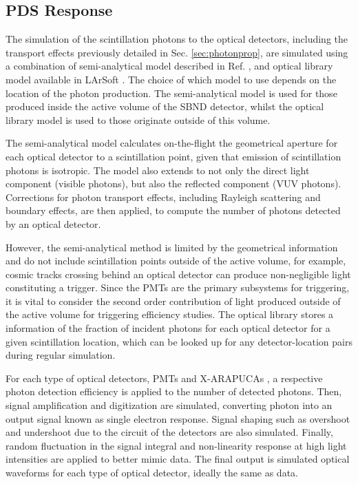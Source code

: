 \subsection{PDS Response}

The simulation of the scintillation photons to the optical detectors, including the transport effects previously detailed in Sec. \ref{sec:photonprop}, are simulated using a combination of semi-analytical model described in Ref. \cite{}, and optical library model available in LArSoft \cite{}.
The choice of which model to use depends on the location of the photon production.
The semi-analytical model is used for those produced inside the active volume of the SBND detector, whilst the optical library model is used to those originate outside of this volume.

The semi-analytical model calculates on-the-flight the geometrical aperture for each optical detector to a scintillation point, given that emission of scintillation photons is isotropic.
The model also extends to not only the direct light component (visible photons), but also the reflected component (VUV photons). 
Corrections for photon transport effects, including Rayleigh scattering and boundary effects, are then applied, to compute the number of photons detected by an optical detector.

However, the semi-analytical method is limited by the geometrical information and do not include scintillation  points outside of the active volume, for example, cosmic tracks crossing behind an optical detector can produce non-negligible light constituting a trigger.
Since the PMTs are the primary subsystems for triggering, it is vital to consider the second order contribution of light produced outside of the active volume for triggering efficiency studies.
The optical library stores a information of the fraction of incident photons for each optical detector for a given scintillation location, which can be looked up for any detector-location pairs during regular simulation. 

For each type of optical detectors, PMTs and X-ARAPUCAs , a respective photon detection efficiency is applied to the number of detected photons.
Then, signal amplification and digitization are simulated, converting photon into an output signal known as single electron response.
Signal shaping such as overshoot and undershoot due to the circuit of the detectors are also simulated.
Finally, random fluctuation in the signal integral and non-linearity response at high light intensities are applied to better mimic data.
The final output is simulated optical waveforms for each type of optical detector, ideally the same as data. 

